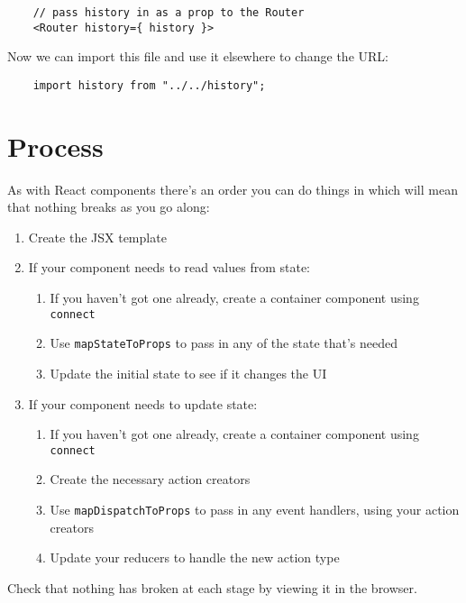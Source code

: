 \begin{verbatim}
    // pass history in as a prop to the Router
    <Router history={ history }>
\end{verbatim}

Now we can import this file and use it elsewhere to change the URL:


\begin{verbatim}
    import history from "../../history";
\end{verbatim}




\section{Process}

As with React components there's an order you can do things in which will mean that nothing breaks as you go along:

\begin{enumerate}
    \item Create the JSX template
    \item If your component needs to read values from state:
        \begin{enumerate}
            \item If you haven't got one already, create a container component using \texttt{connect}
            \item Use \texttt{mapStateToProps} to pass in any of the state that's needed
            \item Update the initial state to see if it changes the UI
        \end{enumerate}
    \item If your component needs to update state:
        \begin{enumerate}
            \item If you haven't got one already, create a container component using \texttt{connect}
            \item Create the necessary action creators
            \item Use \texttt{mapDispatchToProps} to pass in any event handlers, using your action creators
            \item Update your reducers to handle the new action type
        \end{enumerate}
\end{enumerate}

Check that nothing has broken at each stage by viewing it in the browser.


